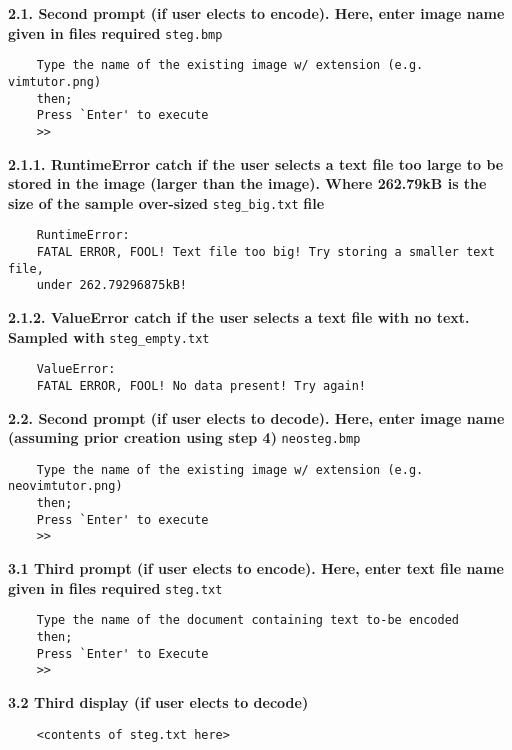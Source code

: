 \documentclass[11pt, english]{article}
\begin{document}
	\textbf{2.1. Second prompt (if user elects to encode). Here, enter image name given in files required} \verb|steg.bmp|

	{\scriptsize\begin{verbatim}
	Type the name of the existing image w/ extension (e.g. vimtutor.png)
	then;
	Press `Enter' to execute
	>>
        \end{verbatim}}

\newpage

	\textbf{2.1.1. RuntimeError catch if the user selects a text file too large to be stored in the image (larger than the image). Where 262.79kB is the size of the sample over-sized} \verb|steg_big.txt| \textbf{file}

	{\scriptsize\begin{verbatim}
	RuntimeError:
	FATAL ERROR, FOOL! Text file too big! Try storing a smaller text file,
	under 262.79296875kB!
	\end{verbatim}}

	\textbf{2.1.2. ValueError catch if the user selects a text file with no text. Sampled with} \verb|steg_empty.txt|

	{\scriptsize\begin{verbatim}
	ValueError:
	FATAL ERROR, FOOL! No data present! Try again!
	\end{verbatim}}

	\textbf{2.2. Second prompt (if user elects to decode). Here, enter image name (assuming prior creation using step 4)} \verb|neosteg.bmp|

        {\scriptsize\begin{verbatim}
	Type the name of the existing image w/ extension (e.g. neovimtutor.png)
	then;
	Press `Enter' to execute
	>>
        \end{verbatim}}

	\textbf{3.1 Third prompt (if user elects to encode). Here, enter text file name given in files required} \verb|steg.txt|

	{\scriptsize\begin{verbatim}
	Type the name of the document containing text to-be encoded
	then;
	Press `Enter' to Execute
	>>
        \end{verbatim}}

	\textbf{3.2 Third display (if user elects to decode)}

	{\scriptsize\begin{verbatim}
	<contents of steg.txt here>
	\end{verbatim}}
\end{document}

